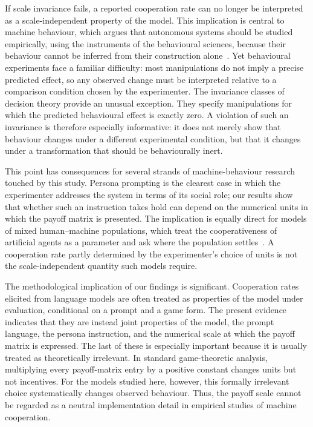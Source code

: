 \documentclass[11pt,a4paper]{article}
\begin{document}
If scale invariance fails, a reported cooperation rate can no longer be interpreted as a scale-independent property of the model. This implication is central to machine behaviour, which argues that autonomous systems should be studied empirically, using the instruments of the behavioural sciences, because their behaviour cannot be inferred from their construction alone~\cite{rahwan2019machine}. Yet behavioural experiments face a familiar difficulty: most manipulations do not imply a precise predicted effect, so any observed change must be interpreted relative to a comparison condition chosen by the experimenter. The invariance classes of decision theory provide an unusual exception. They specify manipulations for which the predicted behavioural effect is exactly zero. A violation of such an invariance is therefore especially informative: it does not merely show that behaviour changes under a different experimental condition, but that it changes under a transformation that should be behaviourally inert.

This point has consequences for several strands of machine-behaviour research touched by this study. Persona prompting is the clearest case in which the experimenter addresses the system in terms of its social role; our results show that whether such an instruction takes hold can depend on the numerical units in which the payoff matrix is presented. The implication is equally direct for models of mixed human--machine populations, which treat the cooperativeness of artificial agents as a parameter and ask where the population settles~\cite{santos2018social,han2011intention,han2013good,perc2017statistical,paiva2018engineering}. A cooperation rate partly determined by the experimenter's choice of units is not the scale-independent quantity such models require.


The methodological implication of our findings is significant. Cooperation rates elicited from language models are often treated as properties of the model under evaluation, conditional on a prompt and a game form. The present evidence indicates that they are instead joint properties of the model, the prompt language, the persona instruction, and the numerical scale at which the payoff matrix is expressed. The last of these is especially important because it is usually treated as theoretically irrelevant. 
In standard game-theoretic analysis, multiplying every payoff-matrix entry by a positive constant changes units but not incentives. 
For the models studied here, however, this formally irrelevant choice systematically changes observed behaviour. Thus, the payoff scale cannot be regarded as a neutral implementation detail in empirical studies of machine cooperation.
\end{document}
